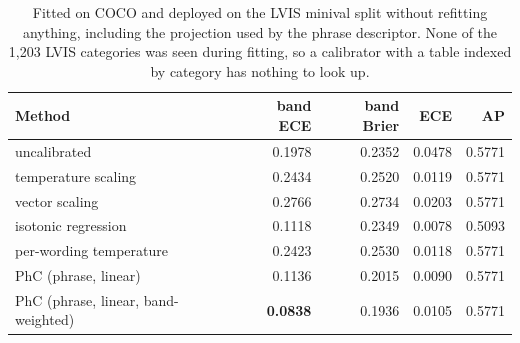 \begin{table}[t]
\caption{Fitted on COCO and deployed on the LVIS minival split without refitting anything, including the projection used by the phrase descriptor. None of the 1{,}203 LVIS categories was seen during fitting, so a calibrator with a table indexed by category has nothing to look up.}
\label{tab:transfer}
\begin{tabular*}{\textwidth}{@{\extracolsep{\fill}}lrrrr@{}}
\toprule
Method & band ECE & band Brier & ECE & AP \\
\midrule
uncalibrated                       & 0.1978 & 0.2352 & 0.0478 & 0.5771 \\
temperature scaling                & 0.2434 & 0.2520 & 0.0119 & 0.5771 \\
vector scaling                     & 0.2766 & 0.2734 & 0.0203 & 0.5771 \\
isotonic regression                & 0.1118 & 0.2349 & 0.0078 & 0.5093 \\
per-wording temperature            & 0.2423 & 0.2530 & 0.0118 & 0.5771 \\
PhC (phrase, linear)               & 0.1136 & 0.2015 & 0.0090 & 0.5771 \\
PhC (phrase, linear, band-weighted) & \textbf{0.0838} & 0.1936 & 0.0105 & 0.5771 \\
\bottomrule
\end{tabular*}
\end{table}
